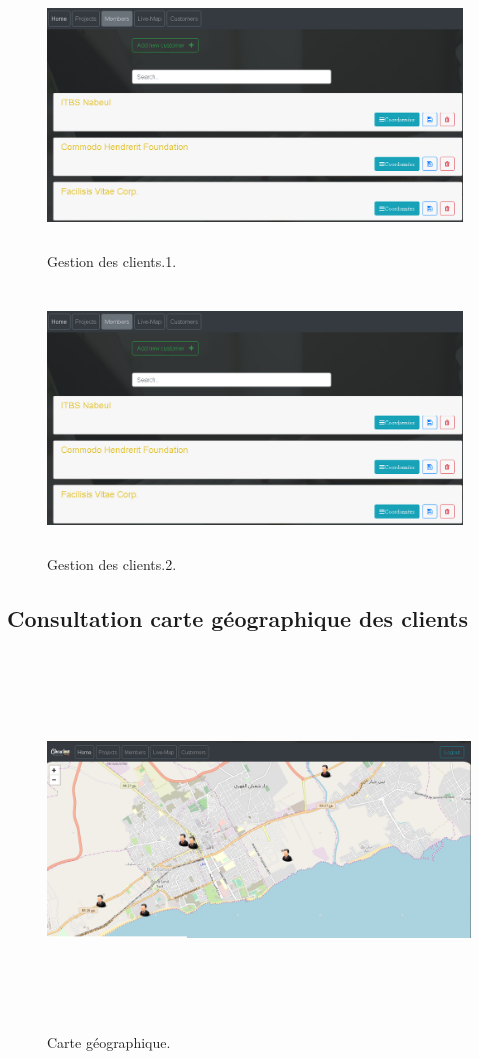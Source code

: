 \begin{figure}[H]
\center
\includegraphics[width=11cm,height=7cm]{./figures/pres/cc1.png}
\caption{Gestion des clients.1.}
\end{figure}




\begin{figure}[H]
\center
\includegraphics[width=11cm,height=7cm]{./figures/pres/cc1.png}
\caption{Gestion des clients.2.}
\end{figure}

\subsection{Consultation carte g\'{e}ographique des clients}


\begin{figure}[H]
\center
\includegraphics[width=15cm,height=10cm]{./figures/pres/map.png}
\caption{Carte g\'{e}ographique.}
\end{figure}

